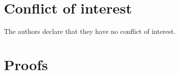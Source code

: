 \section*{Conflict of interest}
%
The authors declare that they have no conflict of interest.



%
%
\appendix
\section{Proofs}
